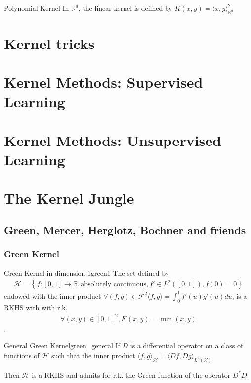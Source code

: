 \documentclass{article}
\begin{document}
\begin{Definition}{Polynomial Kernel}{}
  In $\mathbb{R}^d$, the linear kernel is defined by $K(x, y) = \langle x, y 
  \rangle_{\mathbb{R}^d}^2$
\end{Definition}
\section{Kernel tricks}

\section{Kernel Methods: Supervised Learning}

\section{Kernel Methods: Unsupervised Learning}

\section{The Kernel Jungle}
\subsection{Green, Mercer, Herglotz, Bochner and friends}

\subsubsection{Green Kernel}

\begin{Theorem}{Green Kernel in dimension 1}{green1}
  The set defined by
  \begin{align*}
    \mathcal{H} = \left\{f: [0, 1] \rightarrow \mathbb{R}, \text{absolutely 
    continuous}, f' \in L^2([0, 1]), f(0) = 0 \right\}
  \end{align*}
  endowed with the inner product $\forall (f, g) \in \mathcal{F}^2 \langle f, g
  \rangle = \int_0^1 f'(u)g'(u)du$, 
  is a RKHS with with r.k.
  \begin{align*}
    \forall (x, y) \in [0, 1]^2, K(x, y) = \min(x, y)
  \end{align*}.
\end{Theorem}

\begin{Theorem}{General Green Kernel}{green_general}
  If $D$ is a differential operator on a class of functions of $\mathcal{H}$
  such that the inner product $\langle f, g \rangle_\mathcal{H} = \langle Df, Dg 
  \rangle_{L^2(\mathcal{X})}$

  Then $\mathcal{H}$ is a RKHS and admits for r.k. the Green function of the 
  operator $D^*D$
\end{Theorem}
\end{document}
